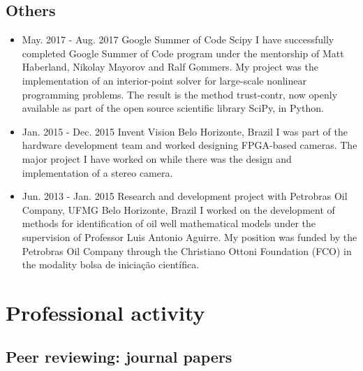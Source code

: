 \documentclass[10pt,A4]{article} %
\begin{document}
\subsection{Others}

\begin{itemize}

    \item {}
    { May. 2017 -   Aug. 2017 }
    { Google Summer of Code }
    { Scipy }
    { I have successfully completed Google Summer of Code program under the mentorship of Matt Haberland, Nikolay Mayorov and Ralf Gommers. My project was the implementation of an interior-point solver for large-scale nonlinear programming problems. The result is the method trust-contr, now openly available as part of the open source scientific library SciPy, in Python. }

    \item {}
    { Jan. 2015 -   Dec. 2015 }
    { Invent Vision }
    { Belo Horizonte, Brazil }
    { I was part of the hardware development team and worked designing FPGA-based cameras. The major project I have worked on while there was the design and implementation of a stereo camera. }

    \item {}
    { Jun. 2013 -   Jan. 2015 }
    { Research and development project with Petrobras Oil Company, UFMG }
    { Belo Horizonte, Brazil }
    { I worked on the development of methods for identification of oil well mathematical models under the supervision of Professor Luis Antonio Aguirre. My position was funded by the Petrobras Oil Company through the Christiano Ottoni Foundation (FCO) in the modality bolsa de iniciação científica. }

\end{itemize}


\section{Professional activity}

\subsection{Peer reviewing: journal papers}
\end{document}

